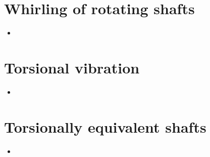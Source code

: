 \documentclass[8pt]{report}
\begin{document}
\section{Whirling of rotating shafts}
	\begin{itemize}
		\item
	\end{itemize}\hrulefill
\section{Torsional vibration}
	\begin{itemize}
		\item
	\end{itemize}\hrulefill
\section{Torsionally equivalent shafts}
	\begin{itemize}
		\item
	\end{itemize}\hrulefill
\end{document}
